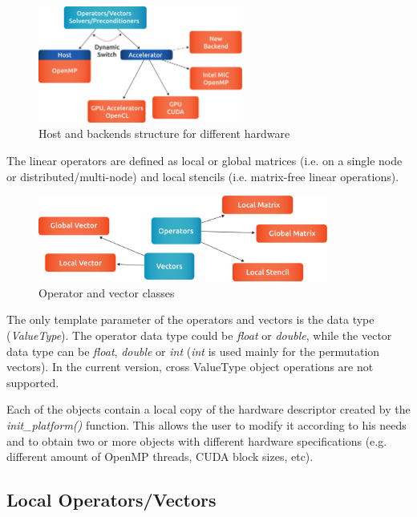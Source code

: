 \begin{figure}[!ht]
\centering
\includegraphics[width=0.6\textwidth]{./fig/structure.pdf}
\caption{Host and backends structure for different hardware}
\label{class-backends}
\end{figure}


The linear operators are defined as local or global matrices (i.e. on a single node or distributed/multi-node) and local stencils (i.e. matrix-free linear operations). 

\begin{figure}[!ht]
\centering
\includegraphics[width=0.85\textwidth]{./fig/operators.pdf}
\caption{Operator and vector classes}
\label{paralution-lib}
\end{figure}


The only template parameter of the operators and vectors is the data type (\emph{ValueType}). The operator data type could be \emph{float} or \emph{double}, while the vector data type can be \emph{float}, \emph{double} or \emph{int} (\emph{int} is used mainly for the permutation vectors). In the current version, cross ValueType object operations are not supported.


Each of the objects contain a local copy of the hardware descriptor created by the \emph{init\_platform()} function. This allows the user to modify it according to his needs and to obtain two or more objects with different hardware specifications (e.g. different amount of OpenMP threads, CUDA block sizes, etc).

\subsection{Local Operators/Vectors}

